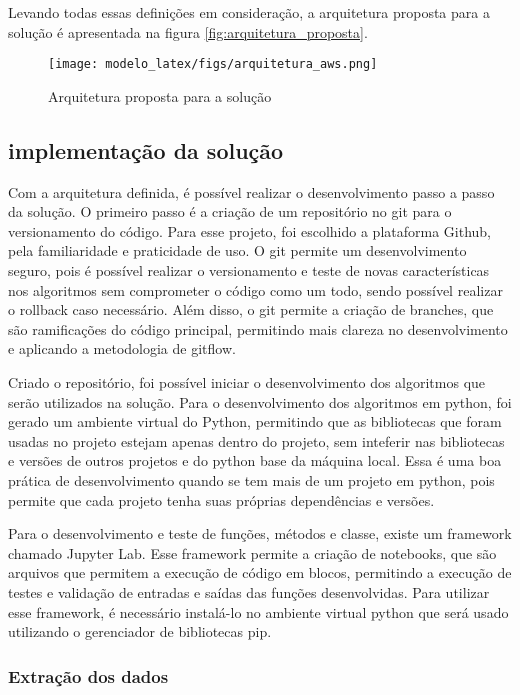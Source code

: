 Levando todas essas definições em consideração, a arquitetura proposta para a solução é apresentada na figura \ref{fig:arquitetura_proposta}.

\begin{figure}[H]
    \centering
    \texttt{[image: modelo\_latex/figs/arquitetura\_aws.png]}
    \caption{Arquitetura proposta para a solução}
    \label{fig:arquitetura_aws}
\end{figure}


\subsection{implementação da solução}

Com a arquitetura definida, é possível realizar o desenvolvimento passo a passo da solução. O primeiro passo é a criação de um repositório no git para o versionamento do código. Para esse projeto, foi escolhido a plataforma Github, pela familiaridade e praticidade de uso. O git permite um desenvolvimento seguro, pois é possível realizar o versionamento e teste de novas características nos algoritmos sem comprometer o código como um todo, sendo possível realizar o rollback caso necessário. Além disso, o git permite a criação de branches, que são ramificações do código principal, permitindo mais clareza no desenvolvimento e aplicando a metodologia de gitflow.

Criado o repositório, foi possível iniciar o desenvolvimento dos algoritmos que serão utilizados na solução.
Para o desenvolvimento dos algoritmos em python, foi gerado um ambiente virtual do Python, permitindo que as bibliotecas que foram usadas no projeto estejam apenas dentro do projeto, sem inteferir nas bibliotecas e versões de outros projetos e do python base da máquina local. Essa é uma boa prática de desenvolvimento quando se tem mais de um projeto em python, pois permite que cada projeto tenha suas próprias dependências e versões.

Para o desenvolvimento e teste de funções, métodos e classe, existe um framework chamado Jupyter Lab. Esse framework permite a criação de notebooks, que são arquivos que permitem a execução de código em blocos, permitindo a execução de testes e validação de entradas e saídas das funções desenvolvidas. Para utilizar esse framework, é necessário instalá-lo no ambiente virtual python que será usado utilizando o gerenciador de bibliotecas pip.

\subsubsection{Extração dos dados}

